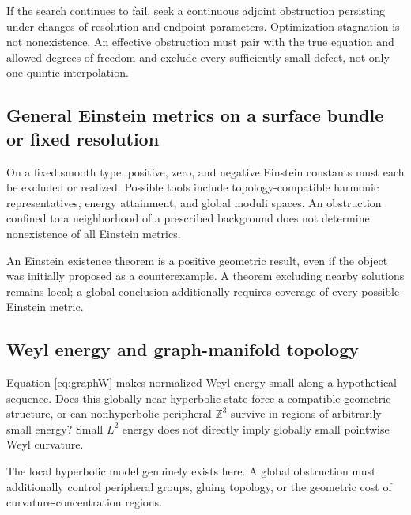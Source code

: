 \documentclass[a4paper,11pt]{article}
\numberwithin{equation}{section}
\theoremstyle{definition}
\newcommand{\Z}{\mathbb Z}
\begin{document}
If the search continues to fail, seek a continuous adjoint obstruction persisting under changes of resolution and endpoint parameters.
Optimization stagnation is not nonexistence.
An effective obstruction must pair with the true equation and allowed degrees of freedom and exclude every sufficiently small defect, not only one quintic interpolation.

\subsection{General Einstein metrics on a surface bundle or fixed resolution}
On a fixed smooth type, positive, zero, and negative Einstein constants must each be excluded or realized.
Possible tools include topology-compatible harmonic representatives, energy attainment, and global moduli spaces.
An obstruction confined to a neighborhood of a prescribed background does not determine nonexistence of all Einstein metrics.

An Einstein existence theorem is a positive geometric result, even if the object was initially proposed as a counterexample.
A theorem excluding nearby solutions remains local; a global conclusion additionally requires coverage of every possible Einstein metric.

\subsection{Weyl energy and graph-manifold topology}
Equation \eqref{eq:graphW} makes normalized Weyl energy small along a hypothetical sequence.
Does this globally near-hyperbolic state force a compatible geometric structure, or can nonhyperbolic peripheral $\Z^3$ survive in regions of arbitrarily small energy?
Small $L^2$ energy does not directly imply globally small pointwise Weyl curvature.

The local hyperbolic model genuinely exists here.
A global obstruction must additionally control peripheral groups, gluing topology, or the geometric cost of curvature-concentration regions.
\end{document}
